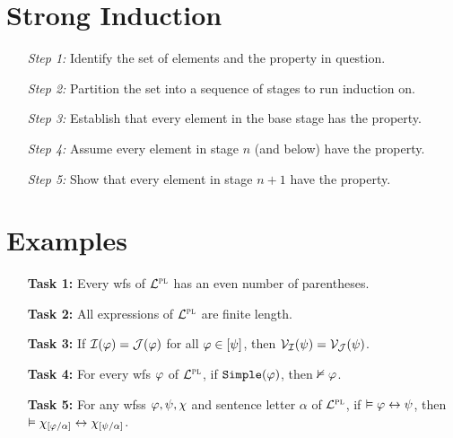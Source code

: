\documentclass[a4paper, 11pt]{article} %
\begin{document}
\section*{Strong Induction}

\begin{enumerate}
  \item[\it Step 1:] Identify the set of elements and the property in question.
  \item[\it Step 2:] Partition the set into a sequence of stages to run induction on.
  \item[\it Step 3:] Establish that every element in the base stage has the property.
  \item[\it Step 4:] Assume every element in stage $n$ (and below) have the property. 
  \item[\it Step 5:] Show that every element in stage $n+1$ have the property. 
\end{enumerate}





\section*{Examples}

\begin{enumerate}
  \item[\bf Task 1:] Every wfs of $\mathcal{L}^{\textsc{pl}}$ has an even number of parentheses. 
  \item[\bf Task 2:] All expressions of $\mathcal{L}^{\textsc{pl}}$ are finite length.
  \item[\bf Task 3:] If $\mathcal{I}(\varphi) = \mathcal{J}(\varphi)$ for all $\varphi \in [\psi]$, then $\mathcal{V}_{\mathcal{I}}(\psi) = \mathcal{V}_{\mathcal{J}}(\psi)$. 
  \item[\bf Task 4:] For every wfs $\varphi$ of $\mathcal{L}^{\textsc{pl}}$, if $\texttt{Simple}(\varphi)$, then $\nvDash\varphi$. %
  \item[\bf Task 5:] For any wfss $\varphi,\psi,\chi$ and sentence letter $\alpha$ of $\mathcal{L}^{\textsc{pl}}$, if $\vDash \varphi \leftrightarrow \psi$, then $\vDash \chi_{[\varphi/\alpha]}\leftrightarrow\chi_{[\psi/\alpha]}$.
\end{enumerate}
\end{document}

